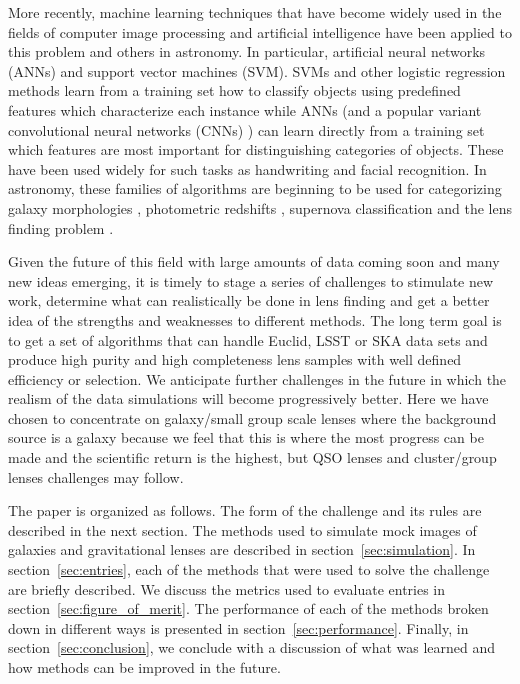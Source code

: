 \documentclass[useAMS,usenatbib]{mnras}
\begin{document}
More recently, machine learning techniques that have become widely used in the fields of computer image processing and artificial intelligence have been applied to this problem and others in astronomy.  In particular, artificial neural networks (ANNs) and support vector machines (SVM).  SVMs and other logistic regression methods learn from a training set how to classify objects using predefined features which characterize each instance while ANNs (and a popular variant convolutional neural networks (CNNs) ) can learn directly from a training set which features are most important for distinguishing categories of objects.  These have been used widely for such tasks as handwriting and facial recognition.  In astronomy, these families of algorithms are beginning to be used for categorizing galaxy morphologies \citep{2015MNRAS.450.1441D}, photometric redshifts \citep{2017MNRAS.465.1959C,2016PASP..128j4502S,2017NewA...51..169S}, supernova classification \citep{2016ApJS..225...31L} and the lens finding problem \citep{2017MNRAS.471..167J,2017arXiv170207675P,2017MNRAS.465.4325O,2017A&A...597A.135B,hartley2017support}.

Given the future of this field with large amounts of data coming soon and many new ideas emerging, it is timely to stage a series of challenges to stimulate new work, determine what can realistically be done in lens finding and get a better idea of the strengths and weaknesses to different methods.  The long term goal is to get a set of algorithms that can handle Euclid, LSST or SKA data sets and produce high purity and high completeness lens samples with well defined efficiency or selection.  We anticipate further challenges in the future in which the realism of the data simulations will become progressively better.  Here we have chosen to concentrate on galaxy/small group scale lenses where the background source is a galaxy because we feel that this is where the most progress can be made and the scientific return is the highest, but QSO lenses and cluster/group lenses challenges may follow.

The paper is organized as follows.  The form of the challenge and its rules are described in the next section.  The methods used to simulate mock images of galaxies and gravitational lenses are described in section~\ref{sec:simulation}.  In section~\ref{sec:entries}, each of the methods that were used to solve the challenge are briefly described.  We discuss the metrics used to evaluate entries in section~\ref{sec:figure_of_merit}.  The performance of each of the methods broken down in different ways is presented in section~\ref{sec:performance}.  Finally,  in section~\ref{sec:conclusion}, we conclude with a discussion of what was learned and how methods can be improved in the future.
\end{document}
